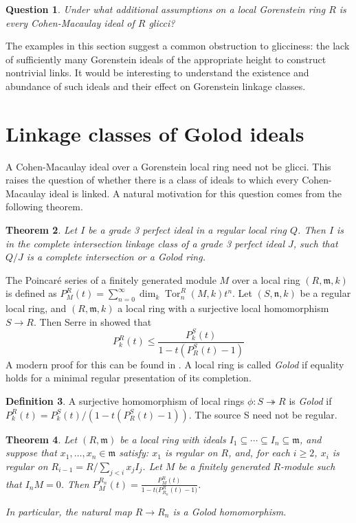 \documentclass[11pt,letterpaper]{amsart}
\DeclareMathOperator{\Tor}{Tor}
\newcommand{\x}{\xrightarrow{}}
\theoremstyle{plain}
\newtheorem{thm}{Theorem}[section]
\newtheorem{question}[thm]{Question}
\theoremstyle{definition}
\newtheorem{defi}[thm]{Definition}
\theoremstyle{remark}
\begin{document}
\begin{question}\label{whenisCMglicci}
Under what additional assumptions on a local Gorenstein
ring $R$ is every Cohen-Macaulay ideal of $R$ glicci?
\end{question}

The examples in this section suggest a common obstruction to glicciness: the lack of sufficiently many Gorenstein ideals of the appropriate height to construct nontrivial links. It would be interesting to understand the existence and abundance of such ideals and their effect on Gorenstein linkage classes.



\section{Linkage classes of Golod ideals}
A Cohen-Macaulay ideal over a Gorenstein local ring need not be glicci. This raises the question of whether there is a class of ideals to which every Cohen-Macaulay ideal is linked. A natural motivation for this question comes from the following theorem.

\begin{thm}\cite[Theorem~1.2,3.7]{christensen2020linkage} Let $I$ be a grade 3 perfect ideal in a regular local ring $Q$. Then $I$ is in the complete intersection linkage class of a grade 3 perfect ideal $J$, such that $Q/J$ is a complete intersection or a Golod ring.     
\end{thm}

The Poincaré series of a finitely generated module $M$ over a local ring $(R,\mathfrak m,k)$ is defined as $P_M^R(t)=\sum_{n=0}^\infty \dim_k\Tor_n^R(M,k)t^n$. Let $(S,\mathfrak n,k)$ be a regular local ring, and $(R,\mathfrak m,k)$ a local ring with a surjective local homomorphism $S\x R$. Then Serre in \cite{serre1965algebre} showed that \[P_k^R(t)\le \frac{P_k^S(t)}{1-t(P_R^S(t)-1)}\] A modern proof for this can be found in \cite[Proposition~3.3.2]{avramov1998infinite}. A local ring is called \emph{Golod} if equality holds for a minimal regular
presentation of its completion. %
\begin{defi}
A surjective homomorphism of local rings $\phi:S\twoheadrightarrow R$ is \emph{Golod} if $P_k^R(t)= {P_k^S(t)}/{(1-t(P_R^S(t)-1))}$.
The source S need not be regular.
\end{defi}

\begin{thm}\cite[Theorem~3.1]{gover1980class}\label{GoverSalmon}
Let \((R,\mathfrak m)\) be a local ring with ideals $I_1\subseteq \cdots \subseteq I_n\subseteq \mathfrak m$, 
and suppose that \(x_1,\ldots,x_n\in \mathfrak m\) satisfy: \(x_1\) is regular on \(R\), and, for each \(i\geq 2\), \(x_i\) is regular on $R_{i-1}=R/\sum_{j<i}x_jI_j$. 
Let \(M\) be a finitely generated \(R\)-module such that \(I_nM=0\). Then $P_M^{R_n}(t)=\frac{P_M^R(t)}{1-t\bigl(P_{R_n}^R(t)-1\bigr)}$. 

In particular, the natural map \(R\to R_n\) is a Golod homomorphism.
\end{thm}
\end{document}
